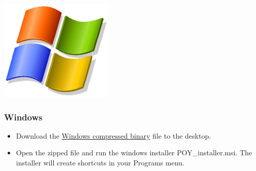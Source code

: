 \begin{flushleft}
	\begin{minipage}[c]{0.074\textwidth}
	   	\includegraphics[width=\textwidth]{figures/figLogoWindows.jpg}
	\end{minipage}
	\quad
	\begin{minipage}[t]{0.88\textwidth}
		   	\subsubsection{Windows}
	\end{minipage}
		\begin{itemize}
			\item
                Download the
                \href{http://research.amnh.org/scicomp/projects/poy.php}{Windows compressed binary} file to the desktop.

			\item 
                Open the zipped file and run the windows installer
                POY\_installer.msi. The installer will create shortcuts in your
                Programs menu.
		\end{itemize}


\end{flushleft}
